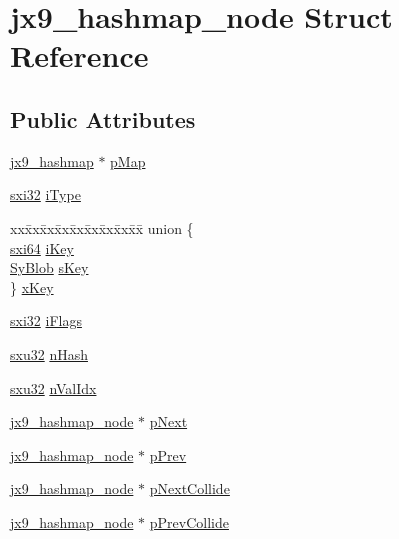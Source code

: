 \hypertarget{structjx9__hashmap__node}{\section{jx9\-\_\-hashmap\-\_\-node Struct Reference}
\label{dc/daf/structjx9__hashmap__node}
}
\subsection*{Public Attributes}
\begin{DoxyCompactItemize}
\item 
\hyperlink{structjx9__hashmap}{jx9\-\_\-hashmap} $\ast$ \hyperlink{structjx9__hashmap__node_a9727ebe65e40b91f8b5651528a57acf0}{p\-Map}
\item 
\hyperlink{unqlite_8c_a5a58035d4ae379178e2ca46cc3272fc5}{sxi32} \hyperlink{structjx9__hashmap__node_a9ca84edc146067e04a0bbed8c188eb00}{i\-Type}
\item 
\begin{tabbing}
xx\=xx\=xx\=xx\=xx\=xx\=xx\=xx\=xx\=\kill
union \{\\
\>\hyperlink{unqlite_8c_a7913a13763a99412223d5dfa1829dd73}{sxi64} \hyperlink{structjx9__hashmap__node_aab1696c34a733165315437cb9b13e556}{iKey}\\
\>\hyperlink{struct_sy_blob}{SyBlob} \hyperlink{structjx9__hashmap__node_a916a33768b366af53f0a3471017f54fa}{sKey}\\
\} \hyperlink{structjx9__hashmap__node_acb889087bd830fb7096a77eaa94a0af4}{xKey}\\

\end{tabbing}\item 
\hyperlink{unqlite_8c_a5a58035d4ae379178e2ca46cc3272fc5}{sxi32} \hyperlink{structjx9__hashmap__node_a71d41efa42759b190fb20e54317ed497}{i\-Flags}
\item 
\hyperlink{unqlite_8c_abc5a8a3f345c200c98c485551f49666e}{sxu32} \hyperlink{structjx9__hashmap__node_ac6176dd80b0926c8c047ec810dcdee91}{n\-Hash}
\item 
\hyperlink{unqlite_8c_abc5a8a3f345c200c98c485551f49666e}{sxu32} \hyperlink{structjx9__hashmap__node_ac2747fef1771b1fbef87d25446bfad96}{n\-Val\-Idx}
\item 
\hyperlink{structjx9__hashmap__node}{jx9\-\_\-hashmap\-\_\-node} $\ast$ \hyperlink{structjx9__hashmap__node_ab79003c8692884d3cc33ce80aa7d5baf}{p\-Next}
\item 
\hyperlink{structjx9__hashmap__node}{jx9\-\_\-hashmap\-\_\-node} $\ast$ \hyperlink{structjx9__hashmap__node_a32282593ab7e0c4ef7918bebfbe1893d}{p\-Prev}
\item 
\hyperlink{structjx9__hashmap__node}{jx9\-\_\-hashmap\-\_\-node} $\ast$ \hyperlink{structjx9__hashmap__node_ae5f97374f8f2f0fd72ed0a112b3549fe}{p\-Next\-Collide}
\item 
\hyperlink{structjx9__hashmap__node}{jx9\-\_\-hashmap\-\_\-node} $\ast$ \hyperlink{structjx9__hashmap__node_a0cbf564997e1fcb862d64be3f5b023f3}{p\-Prev\-Collide}
\end{DoxyCompactItemize}


